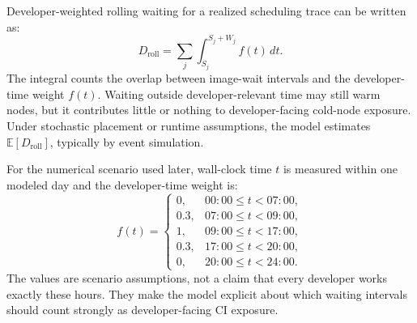 \documentclass[11pt,a4paper]{article}
\newcommand{\E}{\mathbb{E}}
\begin{document}
Developer-weighted rolling waiting for a realized scheduling trace can be written as:
\begin{equation}
  D_{\mathrm{roll}}
  =
  \sum_j
  \int_{S_j}^{S_j+W_j} f(t)\,dt.
\end{equation}
The integral counts the overlap between image-wait intervals and the developer-time weight \(f(t)\). Waiting outside developer-relevant time may still warm nodes, but it contributes little or nothing to developer-facing cold-node exposure. Under stochastic placement or runtime assumptions, the model estimates \(\E[D_{\mathrm{roll}}]\), typically by event simulation.

For the numerical scenario used later, wall-clock time \(t\) is measured within one modeled day and the developer-time weight is:
\begin{equation}
 f(t)=
 \begin{cases}
 0, & 00{:}00 \le t < 07{:}00,\\
 0.3, & 07{:}00 \le t < 09{:}00,\\
 1, & 09{:}00 \le t < 17{:}00,\\
 0.3, & 17{:}00 \le t < 20{:}00,\\
 0, & 20{:}00 \le t < 24{:}00.
 \end{cases}
\end{equation}
The values are scenario assumptions, not a claim that every developer works exactly these hours. They make the model explicit about which waiting intervals should count strongly as developer-facing CI exposure.
\end{document}
